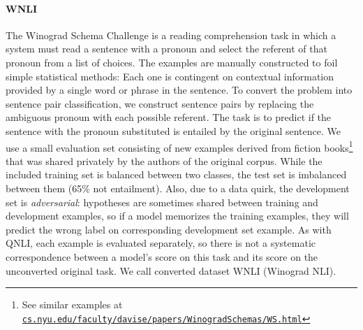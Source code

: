 \paragraph{WNLI}
The Winograd Schema Challenge \citep{levesque2011winograd} is a reading comprehension task in which a system must read a sentence with a pronoun and select the referent of that pronoun from a list of choices. 
The examples are manually constructed to foil simple statistical methods: Each one is contingent on contextual information provided by a single word or phrase in the sentence. 
To convert the problem into sentence pair classification, we construct sentence pairs by replacing the ambiguous pronoun with each possible referent.
The task is to predict if the sentence with the pronoun substituted is entailed by the original sentence.
We use a small evaluation set consisting of new examples derived from fiction books\footnote{See similar examples at 
\href{https://cs.nyu.edu/faculty/davise/papers/WinogradSchemas/WS.html}{\tt cs.nyu.edu/\allowbreak faculty/\allowbreak davise/\allowbreak papers/\allowbreak WinogradSchemas/\allowbreak WS.html}} that was shared privately by the authors of the original corpus. 
While the included training set is balanced between two classes,  the test set is imbalanced between them (65\% not entailment). Also, due to a data quirk, the development set is \textit{adversarial}: hypotheses are sometimes shared between training and development examples, so if a model memorizes the training examples, they will predict the wrong label on corresponding development set example. As with QNLI, each example is evaluated separately, so there is not a systematic correspondence between a model's score on this task and its score on the unconverted original task.
We call converted dataset WNLI (Winograd NLI).


